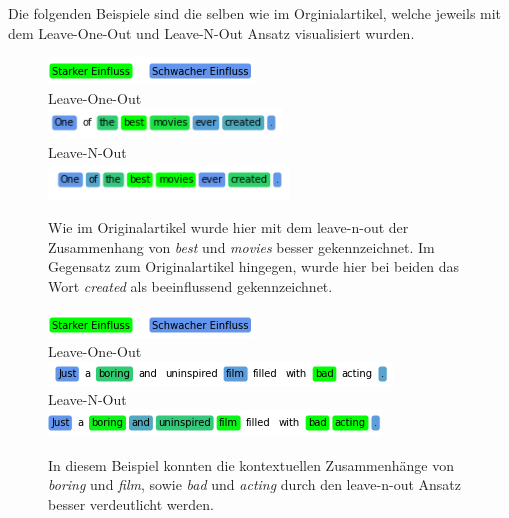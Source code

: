 \documentclass[DIV=13,fontsize=11pt]{scrartcl}
\begin{document}
Die folgenden Beispiele sind die selben wie im Orginialartikel, welche
jeweils mit dem Leave-One-Out und Leave-N-Out Ansatz visualisiert wurden.

\begin{figure}[H]
    \centering
    \includegraphics[]{img/legend.png}\\
    Leave-One-Out\\
    \includegraphics[]{img/first_ex_loo.png}\\
    Leave-N-Out\\
    \includegraphics[]{img/first_ex_lno.png}
    \caption{Wie im Originalartikel wurde hier mit dem leave-n-out der Zusammenhang von \textit{best} und \textit{movies} besser gekennzeichnet. Im Gegensatz zum Originalartikel hingegen, wurde hier bei beiden das Wort \textit{created} als beeinflussend gekennzeichnet.}
    \label{fig:ex1}
\end{figure}

\begin{figure}[H]
    \centering
    \includegraphics[]{img/legend.png}\\
    Leave-One-Out\\
    \includegraphics[]{img/sec_ex_loo.png}\\
    Leave-N-Out\\
    \includegraphics[]{img/sec_ex_lno.png}
    \caption{In diesem Beispiel konnten die kontextuellen Zusammenhänge von \textit{boring} und \textit{film}, sowie \textit{bad} und \textit{acting} durch den leave-n-out Ansatz besser verdeutlicht werden.}
    \label{fig:ex2}
\end{figure}
\end{document}
